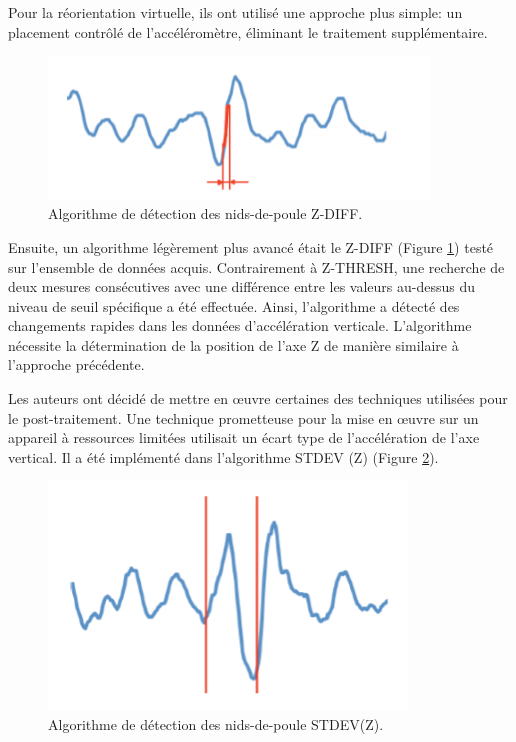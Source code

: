 Pour la réorientation virtuelle, ils ont utilisé une approche plus simple: un placement contrôlé de l'accéléromètre, éliminant le traitement supplémentaire.

\begin{figure}[h!]
  \center
  \includegraphics[width=0.9\textwidth]{Images/chapter2/relatedWork4.PNG}
  \caption{Algorithme de détection des nids-de-poule Z-DIFF.}
  \label{fig:graph_Z_DIFF}
\end{figure}

Ensuite, un algorithme légèrement plus avancé était le Z-DIFF (Figure \ref{fig:graph_Z_DIFF}) testé sur l'ensemble de données acquis. Contrairement à Z-THRESH, une recherche de deux mesures consécutives avec une différence entre les valeurs au-dessus du niveau de seuil spécifique a été effectuée. Ainsi, l'algorithme a détecté des changements rapides dans les données d'accélération verticale. L'algorithme nécessite la détermination de la position de l'axe Z de manière similaire à l'approche précédente. 


Les auteurs ont décidé de mettre en œuvre certaines des techniques utilisées pour le post-traitement. Une technique prometteuse pour la mise en œuvre sur un appareil à ressources limitées utilisait un écart type de l'accélération de l'axe vertical. Il a été implémenté dans l'algorithme STDEV (Z) (Figure \ref{fig:graph_STDEV_z}).

\begin{figure}[h!]
  \center
  \includegraphics[width=0.85\textwidth]{Images/chapter2/relatedWork5.PNG}
  \caption{Algorithme de détection des nids-de-poule STDEV(Z).}
  \label{fig:graph_STDEV_z}
\end{figure}

